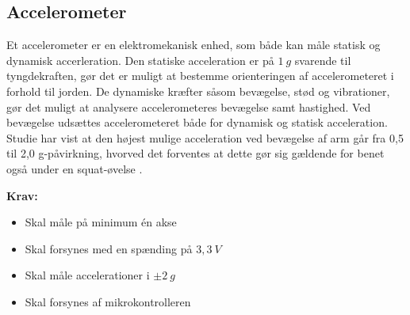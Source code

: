 \subsection{Accelerometer}
Et accelerometer er en elektromekanisk enhed, som både kan måle statisk og dynamisk accerleration. Den statiske acceleration er på $1~g$ svarende til tyngdekraften, gør det er muligt at bestemme orienteringen af accelerometeret i forhold til jorden. De dynamiske kræfter såsom bevægelse, stød og vibrationer, gør det muligt at analysere accelerometeres bevægelse samt hastighed. Ved bevægelse udsættes accelerometeret både for dynamisk og statisk acceleration. Studie har vist at den højest mulige acceleration ved bevægelse af arm går fra 0,5 til 2,0 g-påvirkning, hvorved det forventes at dette gør sig gældende for benet også under en squat-øvelse \citep{bernmarka2002}. 
\vspace{3mm}

\textbf{Krav:}
\begin{itemize}
\item Skal måle på minimum én akse
\item Skal forsynes med en spænding på $3,3~V$
\item Skal måle accelerationer i $\pm2~g$
\item Skal forsynes af mikrokontrolleren
\end{itemize}
